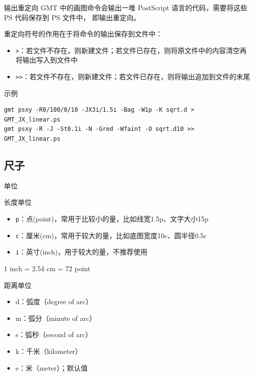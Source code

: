 \documentclass[UTF8, 11pt]{ctexbeamer}
\begin{document}
\begin{frame}[fragile]{输出重定向}
GMT 中的画图命令会输出一堆 PostScript 语言的代码，需要将这些 PS 代码保存到 PS 文件中，
即输出重定向。

重定向符号的作用在于将命令的输出保存到文件中：
\begin{itemize}
\item \texttt{>}：若文件不存在，则新建文件；若文件已存在，则将原文件中的内容清空再将输出写入到文件中
\item \texttt{>>}：若文件不存在，则新建文件；若文件已存在，则将输出追加到文件的末尾
\end{itemize}

\begin{block}{示例}
\scriptsize{
\begin{verbatim}
gmt psxy -R0/100/0/10 -JX3i/1.5i -Bag -W1p -K sqrt.d > GMT_JX_linear.ps
gmt psxy -R -J -St0.1i -N -Gred -Wfaint -O sqrt.d10 >> GMT_JX_linear.ps
\end{verbatim}
}
\end{block}
\end{frame}

\subsection{尺子}
\begin{frame}{单位}
\begin{block}{长度单位}
\begin{itemize}
\item \texttt{p}：点(point)，常用于比较小的量，比如线宽1.5p、文字大小15p
\item \texttt{c}：厘米(cm)，常用于较大的量，比如底图宽度10c、圆半径0.5c
\item \texttt{i}：英寸(inch)，用于较大的量，不推荐使用
\end{itemize}
1 inch = 2.54 cm = 72 point
\end{block}

\begin{block}{距离单位}
\begin{itemize}
\item d：弧度（degree of arc）
\item m：弧分（minute of arc）
\item s：弧秒（second of arc）
\item k：千米（kilometer）
\item e：米（meter）；默认值
\end{itemize}
\end{block}
\end{frame}
\end{document}
